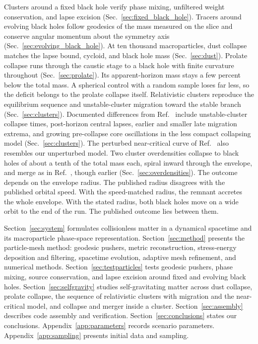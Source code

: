 Clusters around a fixed black hole verify phase mixing, unfiltered weight conservation, and lapse excision (Sec.~\ref{sec:fixed_black_hole}). Tracers around evolving black holes follow geodesics of the mass measured on the slice and conserve angular momentum about the symmetry axis (Sec.~\ref{sec:evolving_black_hole}). At ten thousand macroparticles, dust collapse \cite{Oppenheimer:1939ue} matches the lapse bound, cycloid, and black hole mass (Sec.~\ref{sec:dust}). Prolate collapse runs through the caustic stage to a black hole with finite curvature throughout (Sec.~\ref{sec:prolate}). Its apparent-horizon mass stays a few percent below the total mass. A spherical control with a random sample loses far less, so the deficit belongs to the prolate collapse itself. Relativistic clusters reproduce the equilibrium sequence \cite{1985ApJ...298...34S,1985ApJ...298...58S} and unstable-cluster migration toward the stable branch \cite{Font:2001ew,Wu:2026nrpic} (Sec.~\ref{sec:clusters}). Documented differences from Ref.~\cite{Wu:2026nrpic} include unstable-cluster collapse times, post-horizon central lapses, earlier and smaller late migration extrema, and growing pre-collapse core oscillations in the less compact collapsing model (Sec.~\ref{sec:clusters}). The perturbed near-critical curve of Ref.~\cite{Wu:2026nrpic} also resembles our unperturbed model. Two cluster overdensities collapse to black holes of about a tenth of the total mass each, spiral inward through the envelope, and merge as in Ref.~\cite{Wu:2026nrpic}, though earlier (Sec.~\ref{sec:overdensities}). The outcome depends on the envelope radius. The published radius disagrees with the published orbital speed. With the speed-matched radius, the remnant accretes the whole envelope. With the stated radius, both black holes move on a wide orbit to the end of the run. The published outcome lies between them.

Section~\ref{sec:system} formulates collisionless matter in a dynamical spacetime and its macroparticle phase-space representation. Section~\ref{sec:method} presents the particle-mesh method: geodesic pushers, metric reconstruction, stress-energy deposition and filtering, spacetime evolution, adaptive mesh refinement, and numerical methods. Section~\ref{sec:testparticles} tests geodesic pushers, phase mixing, source conservation, and lapse excision around fixed and evolving black holes. Section~\ref{sec:selfgravity} studies self-gravitating matter across dust collapse, prolate collapse, the sequence of relativistic clusters with migration and the near-critical model, and collapse and merger inside a cluster. Section~\ref{sec:assembly} describes code assembly and verification. Section~\ref{sec:conclusions} states our conclusions. Appendix~\ref{app:parameters} records scenario parameters. Appendix~\ref{app:sampling} presents initial data and sampling.
